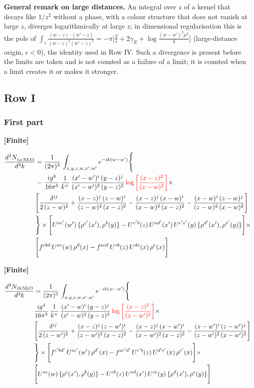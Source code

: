 \documentclass[9pt]{article}
\numberwithin{equation}{section}
\begin{document}
\noindent\textbf{General remark on large distances.} An integral over $z$ of a kernel that decays like $1/z^{2}$ without a phase, with a colour structure that does not vanish at large $z$, diverges logarithmically at large $z$; in dimensional regularisation this is the pole of $\int_{z}\frac{(w-z)\cdot(w'-z)}{(w-z)^{2}(w'-z)^{2}}=-\pi\big[\frac{2}{\epsilon}+2\gamma_{E}+\log\frac{(w-w')^{2}\mu^{2}}{4}\big]$ (large-distance origin, $\epsilon<0$), the identity used in Row IV. Such a divergence is present before the limits are taken and is not counted as a failure of a limit; it is counted when a limit creates it or makes it stronger.
\subsection{Row I}
\subsubsection{First part}
\par\smallskip\noindent\textbf{[Finite]}\par\nobreak
\begin{align}
 \frac{d^{3}N_{1a\,\rm NLO}^{\rm}}{d^{3}k}  & =     \frac{1}{(2\pi)^{3}}\,\int_{x,y,z,w,x',w^{\prime}} e^{-ik(w-w^{\prime})}\Bigg\{\notag \\
& -\, \frac{ig^{4}}{16\pi^{5}}\,\frac{1}{k^{+}}\, \frac{(x'-w')^{i}\,(y-z)^{j}}{(x'-w')^{2}\,(y-z)^{2}}\,{\color{red}\log{\left[\frac{(x-z)^{2}}{(x-w)^{2}}\right]}}\times\notag \\ &  \Bigg[\frac{\delta^{ij}}{2\,(z-w)^{2}}+\frac{(x-z)^{j}\,(z-w)^{i}}{(z-w)^{2}\,(x-z)^{2}}-\frac{(x-z)^{j}\,(x-w)^{i}}{(x-w)^{2}\,(x-z)^{2}}-\frac{(x-w)^{i}\,(z-w)^{j}}{(z-w)^{2}\,(x-w)^{2}}\Bigg] \notag \\
& \Bigg\}\times \Bigg[U^{ac'}(w')\,\{\rho^{c'}(x'),\rho^{b}(y)\}-U^{c'b}(z)\,U^{ad'}(x')\,U^{c'e'}(y)\, \{\rho^{d'}(x'),\rho^{e'}(y)\}\Bigg]\times\notag \\ & \Bigg[f^{cbd}\,U^{ac}(w)\,\rho^{d}(x)-f^{acd}\, U^{cb}(z)\,U^{de}(x)\,\rho^{e}(x)\Bigg]
\end{align}
\par\smallskip\noindent\textbf{[Finite]}\par\nobreak
\begin{align}
\frac{d^{3}N_{1b\, \rm NLO}}{d^{3}k} & =  \frac{1}{(2\pi)^{3}}\,\int_{x,y,z,w,x',w^{\prime}} e^{-ik(w-w^{\prime})}\Bigg\{\notag \\
&  \frac{ig^{4}}{16\pi^{5}}\,\frac{1}{k^{+}}\, \frac{(x'-w)^{i}\,(y-z)^{j}}{(x'-w)^{2}\,(y-z)^{2}}\,{\color{red}\log{\left[\frac{(x-z)^{2}}{(x-w')^{2}}\right]}}\times\notag \\ &  \Bigg[\frac{\delta^{ij}}{2\,(z-w')^{2}}+\frac{(x-z)^{j}\,(z-w')^{i}}{(z-w')^{2}\,(x-z)^{2}}-\frac{(x-z)^{j}\,(x-w')^{i}}{(x-w')^{2}\,(x-z)^{2}}-\frac{(x-w')^{i}\,(z-w')^{j}}{(z-w')^{2}\,(x-w')^{2}}\Bigg] \notag \\
& \Bigg\}\times \Bigg[f^{c'bd'}\,U^{ac'}(w')\,\rho^{d'}(x)-f^{ac'd'}\, U^{c'b}(z)\,U^{d'e'}(x)\,\rho^{e'}(x)\Bigg]\times\notag \\ & \Bigg[U^{ac}(w)\,\{\rho^{c}(x'),\rho^{b}(y)\}-U^{cb}(z)\,U^{ad}(x')\,U^{ce}(y)\, \{\rho^{d}(x'),\rho^{e}(y)\}\Bigg]
\end{align}
\end{document}
